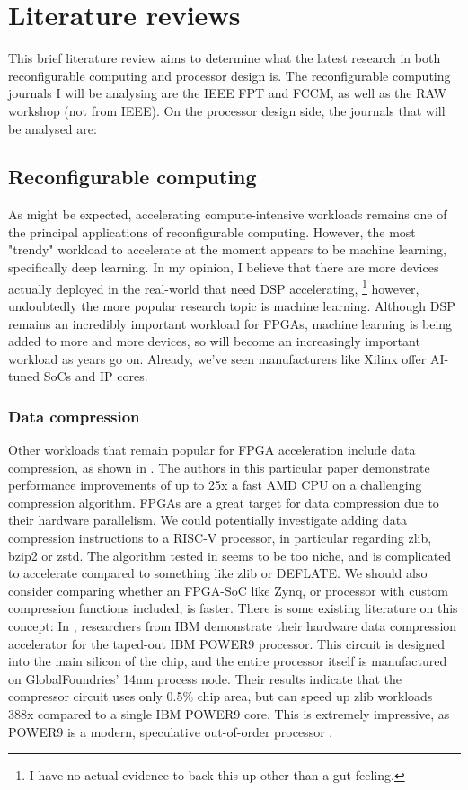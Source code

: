 \documentclass[12pt]{article}
\begin{document}
\section{Literature reviews}
This brief literature review aims to determine what the latest research in both reconfigurable computing
and processor design is. The reconfigurable computing journals I will be analysing are the IEEE FPT 
and FCCM, as well as the RAW workshop (not from IEEE). On the processor design side, the journals that will
be analysed are: 

\subsection{Reconfigurable computing}
As might be expected, accelerating compute-intensive workloads remains one of the principal applications of
reconfigurable computing. However, the most "trendy" workload to accelerate at the moment appears to be
machine learning, specifically deep learning. In my opinion, I believe that there are more devices actually
deployed in the real-world that need DSP accelerating,
\footnote{I have no actual evidence to back this up other than a gut feeling.}
however, undoubtedly the more popular research topic
is machine learning. Although DSP remains an incredibly important workload for FPGAs, machine
learning is being added to more and more devices, so will become an increasingly important workload as
years go on. Already, we've seen manufacturers like Xilinx offer AI-tuned SoCs and IP cores.

\subsubsection{Data compression}

Other workloads that remain popular for FPGA acceleration include data compression, as shown in
\cite{Dongdong2022}. The authors in this particular paper demonstrate performance improvements of up to 25x a
fast AMD CPU on a challenging compression algorithm. FPGAs are a great target for data compression due to
their hardware parallelism. We could potentially investigate adding data compression instructions to a RISC-V
processor, in particular regarding zlib, bzip2 or zstd. The algorithm tested in \cite{Dongdong2022} seems to
be too niche, and is complicated to accelerate compared to something like zlib or DEFLATE. We should also
consider comparing whether an FPGA-SoC like Zynq, or processor with custom compression functions included, is
faster. There is some existing literature on this concept: In \cite{Abali2020}, researchers from IBM
demonstrate their hardware data compression accelerator for the taped-out IBM POWER9 processor. This circuit
is designed into the main silicon of the chip, and the entire processor itself is manufactured on
GlobalFoundries' 14nm process node. Their results indicate that the compressor circuit uses only 0.5\% chip 
area, but can speed up zlib workloads 388x compared to a single IBM POWER9 core. This is extremely impressive, 
as POWER9 is a modern, speculative out-of-order processor \cite{Sadasivam2017IBMPP}. 
\end{document}
